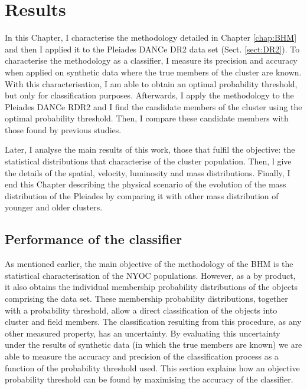 \chapter{Results}
\label{chap:Results}
In this Chapter, I characterise the methodology detailed in Chapter  \ref{chap:BHM} and then I applied it to the Pleiades DANCe DR2 data set (Sect. \ref{sect:DR2}). To characterise the methodology as a classifier, I measure its precision and accuracy when applied on synthetic data where the true members of the cluster are known. With this characterisation, I am able to obtain an optimal probability threshold, but only for classification purposes. Afterwards, I apply the methodology to the Pleiades DANCe RDR2 and I find the candidate members of the cluster using the optimal probability threshold. Then, I compare these candidate members with those found by previous studies.

Later, I analyse the main results of this work, those that fulfil the objective: the statistical distributions that characterise of the cluster population. Then, l give the details of the spatial, velocity, luminosity and mass distributions. Finally, I end this Chapter describing the physical scenario of the evolution of the mass distribution of the Pleiades by comparing it with other mass distribution of younger and older clusters.

\section{Performance of the classifier}
\label{sect:classifier}
As mentioned earlier, the main objective of the methodology of the BHM is the statistical characterisation of the NYOC populations. However, as a by product, it also obtains the individual membership probability distributions of the objects comprising the data set. These membership probability distributions, together with a probability threshold, allow a direct classification of the objects into cluster and field members.  The classification resulting from this procedure, as any other measured property, has an uncertainty. By evaluating this uncertainty under the results of synthetic data (in which the true members are known) we are able to measure the accuracy and precision of the classification process as a function of the probability threshold used. This section explains how an objective probability threshold can be found by maximising the accuracy of the classifier. 

